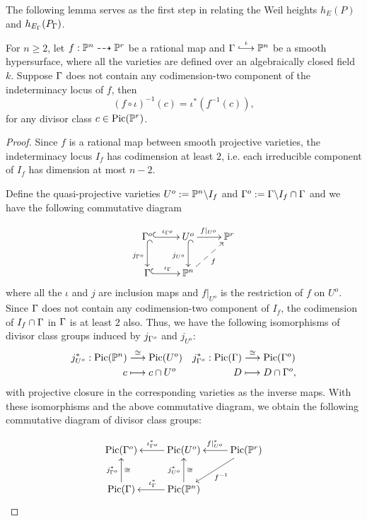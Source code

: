 \documentclass[12pt,reqno]{amsart}
\begin{document}
The following lemma serves as the first step in relating the Weil heights $h_{E}(P)$ and $h_{E_\Gamma}(P_\Gamma)$.

\begin{lemma}\label{Le1} For $n\geq 2$, let $f : \mathbb{P}^n \dashrightarrow \mathbb{P}^r$ be a rational map and $\G \stackrel{\iota}{\longhookrightarrow} \PP^n$ be a smooth hypersurface, where all the varieties are defined over an algebraically closed field $k$. Suppose $\Gamma$ does not contain any codimension-two component of the indeterminacy locus of $f$, then 
$$(f \circ \iota)^{-1}(c)=\iota^*(f^{-1}(c)), $$ for any divisor class $c \in \operatorname{Pic}(\mathbb{P}^r)$.
\end{lemma}
\begin{proof} Since $f$ is a rational map between smooth projective varieties, the indeterminacy locus $I_f$ has codimension at least $2$, i.e. each irreducible component of $I_f$ has dimension at most $n-2$.

Define the quasi-projective varieties $U^o:=\mathbb{P}^n\backslash I_f$ and $\Gamma^o:=\Gamma\backslash I_f \cap \Gamma$ and we have the following commutative diagram 

$$\xymatrix{
\G^o \ar@{^{(}->}[d]_{j_{\G^o}} \ar@{^{(}->}[r]^{\iota_{\G^o}}
&U^o \ar@{->}[r]^{f|_{U^o}} \ar@{^{(}->}[d]_{j_{U^o}}
&\PP^r \\
\G \ar@{^{(}->}[r]^{\iota_\G} 
&\PP^n \ar@{-->}[ur]_f}
$$
where all the $\iota$ and $j$ are inclusion maps and $f|_{U^o}$ is the restriction of $f$ on $U^o$. Since $\Gamma$ does not contain any codimension-two component of $I_f$, the codimension of $I_f \cap \Gamma$ in $\Gamma$ is at least $2$ also. Thus, we have the following isomorphisms of divisor class groups induced by $j_{\Gamma^o}$ and $j_{U^o}$:
\begin{align*} j^*_{U^o}: \operatorname{Pic}(\mathbb{P}^n) &\stackrel{\cong}{\longrightarrow} \operatorname{Pic}(U^o)  &j^*_{\Gamma^o}: \operatorname{Pic}(\Gamma) &\stackrel{\cong}{\longrightarrow} \operatorname{Pic}(\Gamma^o)\\
 c &\longmapsto c \cap U^o & D &\longmapsto D \cap \Gamma^o,
\end{align*} with projective closure in the corresponding varieties as the inverse maps. With these isomorphisms and the above commutative diagram, we obtain the following commutative diagram of divisor class groups:
 

$$\xymatrix{
\Pic(\G^o)
&\Pic(U^o)  \ar@{->}[l]_{\iota_{\G^o}^*} 
&\Pic(\PP^r) \ar@{->}[l]_{f|_{U^o}^*} \ar@{->}[dl]^{f^{-1}} \\
\Pic(\G) \ar@{->}[u]^{j_{\G^o}^*}_\cong 
&\Pic(\PP^n)  \ar@{->}[u]^{j_{U^o}^*}_\cong \ar@{->}[l]_{\iota_\G^*} 
}$$


\end{proof}
\end{document}
